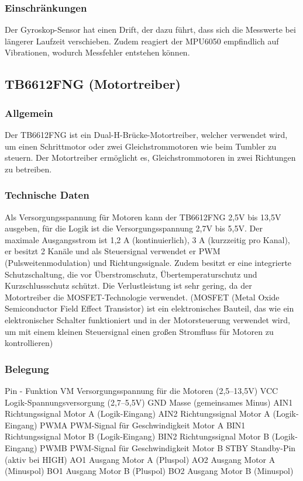 \subsubsection{Einschränkungen}
Der Gyroskop-Sensor hat einen Drift, der dazu führt, dass sich die Messwerte bei längerer Laufzeit verschieben. 
Zudem reagiert der MPU6050 empfindlich auf Vibrationen, wodurch Messfehler entstehen können.
%
\subsection{TB6612FNG (Motortreiber)}
%
\subsubsection{Allgemein}
Der TB6612FNG ist ein Dual-H-Brücke-Motortreiber, welcher verwendet wird, um einen Schrittmotor oder zwei Gleichstrommotoren wie beim Tumbler zu steuern. 
Der Motortreiber ermöglicht es, Gleichstrommotoren in zwei Richtungen zu betreiben.
\subsubsection{Technische Daten}
Als Versorgungsspannung für Motoren kann der TB6612FNG 2,5V bis 13,5V ausgeben, für die Logik ist die Versorgungsspannung 2,7V bis 5,5V. 
Der maximale Ausgangsstrom ist 1,2 A (kontinuierlich), 3 A (kurzzeitig pro Kanal), er besitzt 2 Kanäle und als Steuersignal verwendet er PWM (Pulsweitenmodulation) und Richtungssignale. 
Zudem besitzt er eine integrierte Schutzschaltung, die vor Überstromschutz, Übertemperaturschutz und Kurzschlussschutz schützt. 
Die Verlustleistung ist sehr gering, da der Motortreiber die MOSFET-Technologie verwendet. (MOSFET (Metal Oxide Semiconductor Field Effect Transistor) ist ein elektronisches Bauteil, 
das wie ein elektronischer Schalter funktioniert und in der Motorsteuerung verwendet wird, um mit einem kleinen Steuersignal einen großen Stromfluss für Motoren zu kontrollieren)
\subsubsection{Belegung}
Pin	-	Funktion
VM	Versorgungsspannung für die Motoren (2,5–13,5V)
VCC	Logik-Spannungsversorgung (2,7–5,5V)
GND	Masse (gemeinsames Minus)
AIN1	Richtungssignal Motor A (Logik-Eingang)
AIN2	Richtungssignal Motor A (Logik-Eingang)
PWMA	PWM-Signal für Geschwindigkeit Motor A
BIN1	Richtungssignal Motor B (Logik-Eingang)
BIN2	Richtungssignal Motor B (Logik-Eingang)
PWMB	PWM-Signal für Geschwindigkeit Motor B
STBY	Standby-Pin (aktiv bei HIGH)
AO1	Ausgang Motor A (Pluspol)
AO2	Ausgang Motor A (Minuspol)
BO1	Ausgang Motor B (Pluspol)
BO2	Ausgang Motor B (Minuspol)

